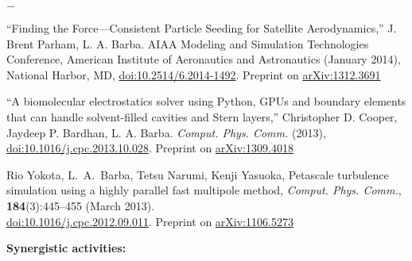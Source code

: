 \documentclass{proposalnsf}
\newlength{\up}
\begin{document}
\vspace{\up}
\begin{list}{$-$}{\setlength{\leftmargin}{1em}}

\item ``Finding the Force---Consistent Particle Seeding for Satellite Aerodynamics,'' J. Brent Parham, L. A. Barba. AIAA Modeling and Simulation Technologies Conference, American Institute of Aeronautics and Astronautics (January 2014), National Harbor, MD, \href{http://dx.doi.org/10.2514/6.2014-1492}{doi:10.2514/6.2014-1492}. Preprint on \href{http://arxiv.org/abs/1312.3691}{arXiv:1312.3691} 

\item ``A biomolecular electrostatics solver using Python, GPUs and boundary elements that can handle solvent-filled cavities and Stern layers,'' Christopher D. Cooper, Jaydeep P. Bardhan, L. A. Barba. \textit{Comput. Phys. Comm.} (2013), \href{http://dx.doi.org/10.1016/j.cpc.2013.10.028}{doi:10.1016/j.cpc.2013.10.028}. Preprint on \href{http://arxiv.org/abs/1309.4018}{arXiv:1309.4018}

\item  Rio Yokota, L.~A.~Barba, Tetsu Narumi, Kenji Yasuoka, Petascale turbulence simulation using a highly parallel fast multipole method, \textit{Comput. Phys. Comm.}, \textbf{184}(3):445--455 (March 2013). \\ \href{http://dx.doi.org/10.1016/j.cpc.2012.09.011}{doi:10.1016/j.cpc.2012.09.011}. Preprint on \href{http://arxiv.org/abs/1106.5273}{arXiv:1106.5273}


\end{list}

\newpage

\textbf{Synergistic activities:} %

\vspace{\up}
\end{document}
